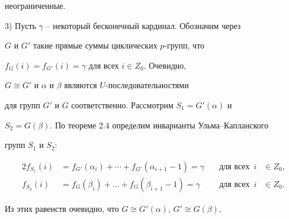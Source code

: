 \begin{pf}
неограниченные.





3) Пусть $\gamma$ -- некоторый бесконечный кардинал. Обозначим через


$G$ и $G'$ такие прямые суммы циклических $p$-групп, что


$f_G(i)=f_{G'}(i)=\gamma$ для всех $i\in Z_0$. Очевидно,


$G\cong G'$ и $\alpha$ и $\beta$ являются $U$-последовательностями


для групп $G'$ и $G$ соответственно. Рассмотрим $S_1=G'(\alpha)$ и


$S_2=G(\beta)$. По теореме 2.4 определим инварианты Ульма--Капланского


групп $S_1$ и $S_2$:


\begin{alignat*}{2}


f_{S_1}(i)&=f_{G'}(\alpha_i)+\dotsb+f_{G'}(\alpha_{i+1}-1)=\gamma


&\quad \text {для всех}\ \; i&\in Z_0,\\


%


f_{S_2}(i)&=f_{G}(\beta_i)+\dotsc+f_{G}(\beta_{i+1}-1)=\gamma &\quad


\text{для всех}\ \; i&\in Z_0.


\end{alignat*}


Из этих равенств очевидно, что $G\cong G'(\alpha)$, $G'\cong G(\beta)$.


\end{pf}






